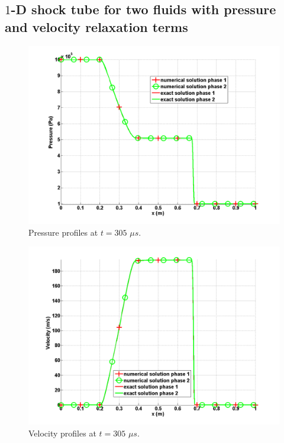 \subsection{$1$-D shock tube for two fluids with pressure and velocity relaxation terms}\label{sec:1d-2-phases-rel-7-eq-sct4}
%
\begin{figure}[H]
\centering
\includegraphics[width=\textwidth]{figures/relaxation_two_phases_pressure.png}
\caption{Pressure profiles at $t=305$ $\mu s$.}
\label{fig:two-fluids-rel-press-7-eqn-sect4}
\end{figure}
%
\begin{figure}[H]
\centering
\includegraphics[width=\textwidth]{figures/relaxation_two_phases_velocity.png}
\caption{Velocity profiles at $t=305$ $\mu s$.}
\label{fig:two-fluids-rel-vel-7-eqn-sect4}
\end{figure}
